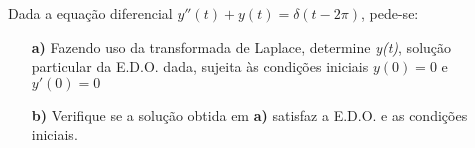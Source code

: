 \linespread{1.5}
Dada a equação diferencial $y''(t) + y(t) = \delta (t-2\pi)$, pede-se:
\begin{itemize}
    \item[\textbf{a)}] Fazendo uso da transformada de Laplace, determine \textit{y(t)}, solução particular da E.D.O. dada, sujeita às condições iniciais $y(0) = 0$ e $y'(0) = 0$
    \item[\textbf{b)}] Verifique se a solução obtida em \textbf{a)} satisfaz a E.D.O. e as condições iniciais.
\end{itemize}